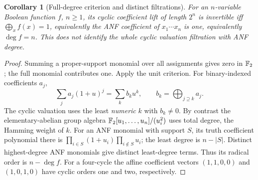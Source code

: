 \documentclass[11pt]{article}
\newtheorem{corollary}[theorem]{Corollary}
\theoremstyle{remark}
\begin{document}
\begin{corollary}[Full-degree criterion and distinct filtrations]
For an $n$-variable Boolean function $f$, $n\geq1$, its cyclic coefficient lift
of length $2^n$ is invertible iff $\bigoplus_x f(x)=1$, equivalently the ANF
coefficient of $x_1\cdots x_n$ is one, equivalently $\deg f=n$.
This does not identify the whole cyclic valuation filtration with ANF degree.
\end{corollary}
\begin{proof}
Summing a proper-support monomial over all assignments gives zero in $\mathbb F_2$;
the full monomial contributes one. Apply the unit criterion.
For binary-indexed coefficients $a_j$,
\[
 \sum_j a_j(1+u)^j=\sum_k b_k u^k,\qquad
 b_k=\bigoplus_{j\supseteq k}a_j.
\]
The cyclic valuation uses the least \emph{numeric} $k$ with $b_k\ne0$.
By contrast the elementary-abelian group algebra
$\mathbb F_2[u_1,\ldots,u_n]/(u_i^2)$ uses total degree, the Hamming weight of $k$.
For an ANF monomial with support $S$, its truth coefficient polynomial there is
$\prod_{i\in S}(1+u_i)\prod_{i\notin S}u_i$; the least degree is $n-|S|$.
Distinct highest-degree ANF monomials give distinct least-degree terms. Thus
its radical order is $n-\deg f$. For a four-cycle the affine coefficient
vectors $(1,1,0,0)$ and $(1,0,1,0)$ have cyclic orders one and two, respectively.
\end{proof}
\end{document}
